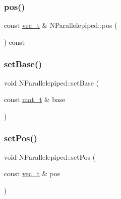 \mbox{\label{class_n_parallelepiped_a15e7d385482e105caad884697aa2a9ab}} 
\subsubsection{\texorpdfstring{pos()}{pos()}}
{\footnotesize\ttfamily const \mbox{\hyperlink{_n_vector_8h_a0a2cfc67e738a3d73e4f12098c4c07f6}{vec\+\_\+t}} \& N\+Parallelepiped\+::pos (\begin{DoxyParamCaption}{ }\end{DoxyParamCaption}) const}

\mbox{\label{class_n_parallelepiped_af50551bef2ecb0d6628a6668824bb2ac}} 
\subsubsection{\texorpdfstring{setBase()}{setBase()}}
{\footnotesize\ttfamily void N\+Parallelepiped\+::set\+Base (\begin{DoxyParamCaption}\item[{const \mbox{\hyperlink{_n_p_matrix_8h_a44dfb60c1e03b44e98a332fb2ae71947}{mat\+\_\+t}} \&}]{base }\end{DoxyParamCaption})}

\mbox{\label{class_n_parallelepiped_a29f55165985609afbc16b91c4143771d}} 
\subsubsection{\texorpdfstring{setPos()}{setPos()}}
{\footnotesize\ttfamily void N\+Parallelepiped\+::set\+Pos (\begin{DoxyParamCaption}\item[{const \mbox{\hyperlink{_n_vector_8h_a0a2cfc67e738a3d73e4f12098c4c07f6}{vec\+\_\+t}} \&}]{pos }\end{DoxyParamCaption})}

\mbox{\label{class_n_parallelepiped_a6cc531927e40a95b48923b56406206d3}} 
